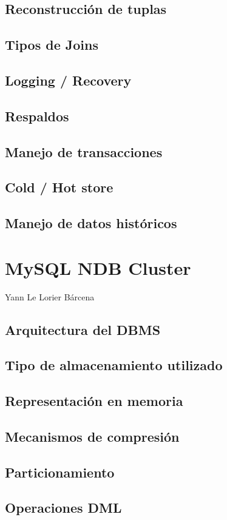 \documentclass{acmart}
\begin{document}
\subsection{Reconstrucción de tuplas}
\subsection{Tipos de Joins}
\subsection{Logging / Recovery}
\subsection{Respaldos}
\subsection{Manejo de transacciones}
\subsection{Cold / Hot store}
\subsection{Manejo de datos históricos}
\newpage

\section{MySQL NDB Cluster}
Yann Le Lorier Bárcena
\subsection{Arquitectura del DBMS}
\subsection{Tipo de almacenamiento utilizado}
\subsection{Representación en memoria}
\subsection{Mecanismos de compresión}
\subsection{Particionamiento}
\subsection{Operaciones DML}
\end{document}

